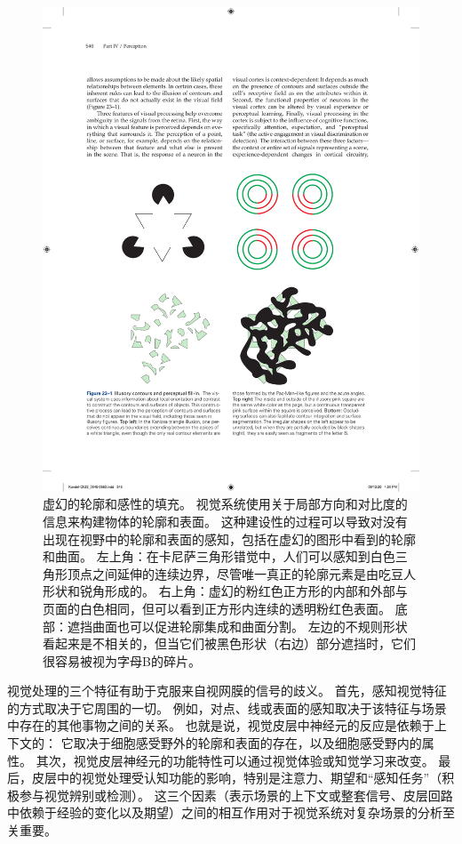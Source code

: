 \begin{figure}[htbp]
	\centering
	\includegraphics[width=1.0\linewidth]{chap23/fig_23_1}
	\caption{虚幻的轮廓和感性的填充。
		视觉系统使用关于局部方向和对比度的信息来构建物体的轮廓和表面。
		这种建设性的过程可以导致对没有出现在视野中的轮廓和表面的感知，包括在虚幻的图形中看到的轮廓和曲面。
		左上角：在卡尼萨三角形错觉中，人们可以感知到白色三角形顶点之间延伸的连续边界，尽管唯一真正的轮廓元素是由吃豆人形状和锐角形成的。
		右上角：虚幻的粉红色正方形的内部和外部与页面的白色相同，但可以看到正方形内连续的透明粉红色表面。
		底部：遮挡曲面也可以促进轮廓集成和曲面分割。
		左边的不规则形状看起来是不相关的，但当它们被黑色形状（右边）部分遮挡时，它们很容易被视为字母B的碎片。}
	\label{fig:23_1}
\end{figure}


视觉处理的三个特征有助于克服来自视网膜的信号的歧义。
首先，感知视觉特征的方式取决于它周围的一切。
例如，对点、线或表面的感知取决于该特征与场景中存在的其他事物之间的关系。
也就是说，视觉皮层中神经元的反应是依赖于上下文的：
它取决于细胞感受野外的轮廓和表面的存在，以及细胞感受野内的属性。
其次，视觉皮层神经元的功能特性可以通过视觉体验或知觉学习来改变。
最后，皮层中的视觉处理受认知功能的影响，特别是注意力、期望和“感知任务”（积极参与视觉辨别或检测）。
这三个因素（表示场景的上下文或整套信号、皮层回路中依赖于经验的变化以及期望）之间的相互作用对于视觉系统对复杂场景的分析至关重要。


